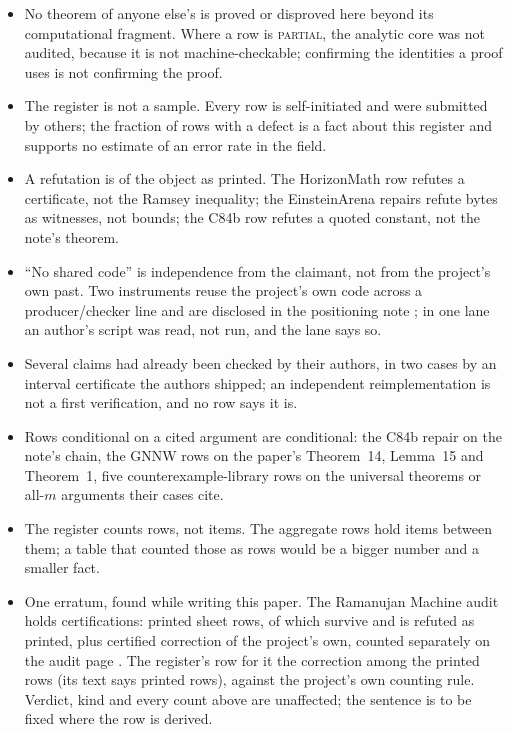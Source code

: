 \documentclass[11pt]{article}
\theoremstyle{plain}
\theoremstyle{definition}
\begin{document}
\begin{itemize}\itemsep2pt
\item No theorem of anyone else's is proved or disproved here beyond its computational fragment. Where a row is \textsc{partial}, the analytic core was not audited, because it is not machine-checkable; confirming the identities a proof uses is not confirming the proof.
\item The register is not a sample. Every row is self-initiated and \RegSubmitted{} were submitted by others; the fraction of rows with a defect is a fact about this register and supports no estimate of an error rate in the field.
\item A refutation is of the object as printed. The HorizonMath row refutes a certificate, not the Ramsey inequality; the EinsteinArena repairs refute bytes as witnesses, not bounds; the C84b row refutes a quoted constant, not the note's theorem.
\item ``No shared code'' is independence from the claimant, not from the project's own past. Two instruments reuse the project's own code across a producer/checker line and are disclosed in the positioning note \cite{Positioning}; in one lane an author's script was read, not run, and the lane says so.
\item Several claims had already been checked by their authors, in two cases by an interval certificate the authors shipped; an independent reimplementation is not a first verification, and no row says it is.
\item Rows conditional on a cited argument are conditional: the C84b repair on the note's chain, the GNNW rows on the paper's Theorem~14, Lemma~15 and Theorem~1, five counterexample-library rows on the universal theorems or all-$m$ arguments their cases cite.
\item The register counts rows, not items. The \RegAggregates{} aggregate rows hold \AggItems{} items between them; a table that counted those as rows would be a bigger number and a smaller fact.
\item One erratum, found while writing this paper. The Ramanujan Machine audit holds \RmCertified{} certifications: \RmPrinted{} printed sheet rows, of which \RmSurvive{} survive and \RmRefuted{} is refuted as printed, plus \RmCorrections{} certified correction of the project's own, counted separately on the audit page \cite{Ramsey}. The register's row for it \RmErratum{} the correction among the printed rows (its text says \RmRegisterPrinted{} printed rows), against the project's own counting rule. Verdict, kind and every count above are unaffected; the sentence is to be fixed where the row is derived.
\end{itemize}
\end{document}
